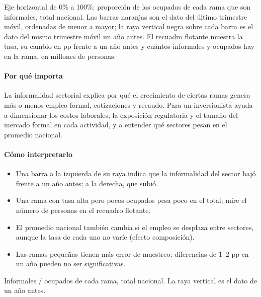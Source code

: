 \begin{leer}
Eje horizontal de 0\% a 100\%: proporción de los ocupados de cada rama que son informales, total nacional. Las barras naranjas son el dato del último trimestre móvil, ordenadas de menor a mayor; la raya vertical negra sobre cada barra es el dato del mismo trimestre móvil un año antes. El recuadro flotante muestra la tasa, su cambio en pp frente a un año antes y cuántos informales y ocupados hay en la rama, en millones de personas.
\end{leer}

\paragraph{Por qué importa}
La informalidad sectorial explica por qué el crecimiento de ciertas ramas genera más o menos empleo formal, cotizaciones y recaudo. Para un inversionista ayuda a dimensionar los costos laborales, la exposición regulatoria y el tamaño del mercado formal en cada actividad, y a entender qué sectores pesan en el promedio nacional.

\paragraph{Cómo interpretarlo}
\begin{itemize}
\item Una barra a la izquierda de su raya indica que la informalidad del sector bajó frente a un año antes; a la derecha, que subió.
\item Una rama con tasa alta pero pocos ocupados pesa poco en el total; mire el número de personas en el recuadro flotante.
\item El promedio nacional también cambia si el empleo se desplaza entre sectores, aunque la tasa de cada uno no varíe (efecto composición).
\item Las ramas pequeñas tienen más error de muestreo; diferencias de 1–2 pp en un año pueden no ser significativas.
\end{itemize}
\begin{formulas}[Fórmulas]
\end{formulas}
\begin{metodo}[Metodología]
Informales / ocupados de cada rama, total nacional. La raya vertical es el dato de un año antes.
\par{}
\end{metodo}

